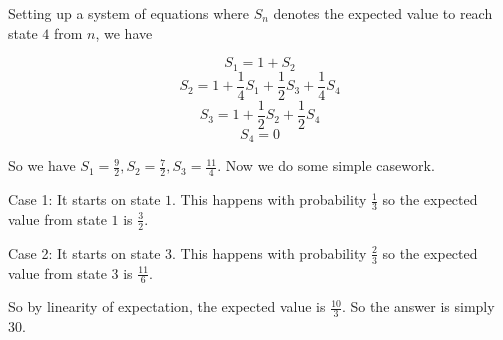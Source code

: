 \begin{solution}
Setting up a system of equations where $S_n$ denotes the expected value to reach state $4$ from $n$, we have

$$S_1 = 1 + S_2$$
$$S_2 = 1+\frac{1}{4}S_1 + \frac{1}{2}S_3 + \frac{1}{4} S_4$$
$$S_3 = 1+\frac{1}{2}S_2 + \frac{1}{2}S_4$$
$$S_4 = 0$$

So we have $S_1 = \frac{9}{2}, S_2 = \frac{7}{2}, S_3 = \frac{11}{4}$. 
Now we do some simple casework.

Case 1: It starts on state $1$.
This happens with probability $\frac{1}{3}$ so the expected value from state $1$ is $\frac{3}{2}$.

Case 2: It starts on state $3$. 
This happens with probability $\frac{2}{3}$ so the expected value from state $3$ is $\frac{11}{6}$.

So by linearity of expectation, the expected value is $\frac{10}{3}$. So the answer is simply $\boxed{30}$.

\end{solution}\bigskip
